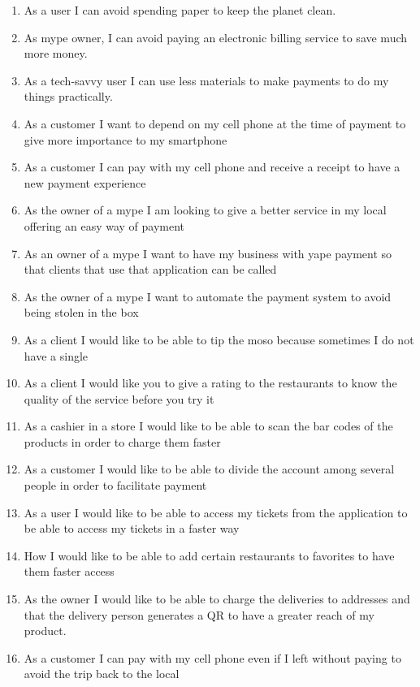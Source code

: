 \documentclass{article}
\begin{document}
\begin{enumerate}
    \item As a user I can avoid spending paper to keep the planet clean.
    \item As mype owner, I can avoid paying an electronic billing service to save much more money.
    \item As a tech-savvy user I can use less materials to make payments to do my things practically.
    \item As a customer I want to depend on my cell phone at the time of payment to give more importance to my smartphone
    \item As a customer I can pay with my cell phone and receive a receipt to have a new payment experience
    \item As the owner of a mype I am looking to give a better service in my local offering an easy way of payment
    \item As an owner of a mype I want to have my business with yape payment so that clients that use that application can be called
    \item As the owner of a mype I want to automate the payment system to avoid being stolen in the box
    \item As a client I would like to be able to tip the moso because sometimes I do not have a single
    
    \item As a client I would like you to give a rating to the restaurants to know the quality of the service before you try it
    \item As a cashier in a store I would like to be able to scan the bar codes of the products in order to charge them faster
    \item As a customer I would like to be able to divide the account among several people in order to facilitate payment
    \item As a user I would like to be able to access my tickets from the application to be able to access my tickets in a faster way
    \item How I would like to be able to add certain restaurants to favorites to have them faster access
    \item As the owner I would like to be able to charge the deliveries to addresses and that the delivery person generates a QR to have a greater reach of my product.
    \item As a customer I can pay with my cell phone even if I left without paying to avoid the trip back to the local
    
    
\end{enumerate}
\end{document}
